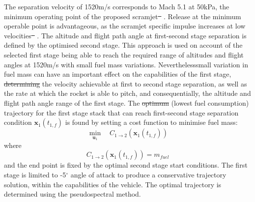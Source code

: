 \documentclass[journal]{new-aiaa}
\providecommand{\DIFadd}[1]{{\protect\color{blue}\uwave{#1}}} %
\providecommand{\DIFdel}[1]{{\protect\color{red}\sout{#1}}}                      %
\providecommand{\DIFaddbegin}{} %
\providecommand{\DIFaddend}{} %
\providecommand{\DIFdelbegin}{} %
\providecommand{\DIFdelend}{} %
\newcommand{\DIFscaledelfig}{0.5}
\newlength{\DIFdelgraphicswidth} %
\newlength{\DIFdelgraphicsheight} %
\newcommand{\DIFaddincludegraphics}[2][]{{\color{blue}\fbox{\DIFOincludegraphics[#1]{#2}}}} %
\newcommand{\DIFdelincludegraphics}[2][]{%
\sbox{\DIFdelgraphicsbox}{\DIFOincludegraphics[#1]{#2}}%
\settoboxwidth{\DIFdelgraphicswidth}{\DIFdelgraphicsbox} %
\settoboxtotalheight{\DIFdelgraphicsheight}{\DIFdelgraphicsbox} %
\scalebox{\DIFscaledelfig}{%
\parbox[b]{\DIFdelgraphicswidth}{\usebox{\DIFdelgraphicsbox}\\[-\baselineskip] \rule{\DIFdelgraphicswidth}{0em}}\llap{\resizebox{\DIFdelgraphicswidth}{\DIFdelgraphicsheight}{%
\setlength{\unitlength}{\DIFdelgraphicswidth}%
\begin{picture}(1,1)%
\thicklines\linethickness{2pt} %
{\color[rgb]{1,0,0}\put(0,0){\framebox(1,1){}}}%
{\color[rgb]{1,0,0}\put(0,0){\line( 1,1){1}}}%
{\color[rgb]{1,0,0}\put(0,1){\line(1,-1){1}}}%
\end{picture}%
}\hspace*{3pt}}} %
} %
\DeclareRobustCommand{\DIFaddbegin}{\DIFOaddbegin \let\includegraphics\DIFaddincludegraphics} %
\DeclareRobustCommand{\DIFaddend}{\DIFOaddend \let\includegraphics\DIFOincludegraphics} %
\DeclareRobustCommand{\DIFdelbegin}{\DIFOdelbegin \let\includegraphics\DIFdelincludegraphics} %
\DeclareRobustCommand{\DIFdelend}{\DIFOaddend \let\includegraphics\DIFOincludegraphics} %
\begin{document}
The separation velocity of 1520m/s corresponds to Mach 5.1 at 50kPa, the minimum operating point of the proposed scramjet\DIFdelbegin \DIFdel{\mbox{%
\cite{Preller2017}}%
}\DIFdelend \DIFaddbegin \DIFadd{\mbox{%
\cite{Preller2017b}}%
}\DIFaddend . Release at the minimum operable point is advantageous, as the scramjet specific impulse increases at low velocities\DIFdelbegin \DIFdel{\mbox{%
\cite{Preller2017}}%
}\DIFdelend \DIFaddbegin \DIFadd{\mbox{%
\cite{Preller2017b}}%
}\DIFaddend .
The altitude and flight path angle at first-second stage separation is defined by the optimised second stage. This approach is used on account of the selected first stage being able to reach the required range of altitudes and flight angles at 1520m/s  with small fuel mass variations. 
Nevertheless\DIFaddbegin \DIFadd{\textcolor{red}{,} }\DIFaddend small variation in fuel mass can have an important effect on the capabilities of the first stage, \DIFdelbegin \DIFdel{determining }\DIFdelend \DIFaddbegin \DIFadd{\textcolor{red}{influencing} }\DIFaddend the velocity achievable at first to second stage separation, as well as the rate at which the rocket is able to pitch, and consequentially, the altitude and flight path angle range of the first stage.
 The \DIFdelbegin \DIFdel{optimum }\DIFdelend \DIFaddbegin \DIFadd{optimal }\DIFaddend (lowest fuel consumption) trajectory for the first stage stack that can reach first-second stage separation condition $\textbf{x}_1(t_{1,f})$ is found by setting a cost function to minimise fuel mass:
\begin{equation}
\min\limits_{\textbf{u}_1} \quad  C_{1 \rightarrow 2}(\textbf{x}_1(t_{1,f}))
\end{equation}
where
\begin{equation}
C_{1 \rightarrow 2}(\textbf{x}_1(t_{1,f})) = m_{fuel}
\end{equation}
and the end point is fixed by the optimal second stage start conditions. The first stage is limited to -5$^\circ$ angle of attack to produce a conservative trajectory solution, within the capabilities of the vehicle. The optimal trajectory is determined using the pseudospectral method. \DIFaddbegin \DIFadd{\textcolor{red}{Three results are obtained by varying the number of nodes in DIDO between 90-92. The computation of three solutions is judged to be sufficient, as the solutions converge to very similar minima, and the fuel mass usage is observed to vary very little. The final result is chosen as the solution which uses the least fuel.}
}\DIFaddend 
\end{document}
